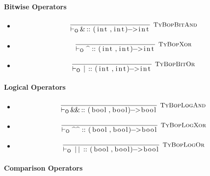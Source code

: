 \documentclass{article}
\newcommand{\code}[1]{\lstinline[columns=fixed]{#1}}
\newcommand{\drmrule}[5]{\frac{#1}{#2\vdash_{\mathsf{#3}}#4}\textsc{\ \small{#5}}}
\newcommand{\mc}[1]{\textnormal{\code{#1}}}
\newcommand{\subsubsubsection}{\paragraph}
\begin{document}
				\subsubsubsection{Bitwise Operators}
				
					\begin{itemize}
						\item
							\begin{align*}
								\drmrule{}{}{O}{\mc{\&} :: \mc{(int,int)->int}}{TyBopBitAnd}
							\end{align*}
						\item
							\begin{align*}
								\drmrule{}{}{O}{\mc{^} :: \mc{(int,int)->int}}{TyBopXor}
							\end{align*}
						\item
							\begin{align*}
								\drmrule{}{}{O}{\mc{|} :: \mc{(int,int)->int}}{TyBopBitOr}
							\end{align*}
					\end{itemize}
				
				\subsubsubsection{Logical Operators}
				
					\begin{itemize}
						\item 
							\begin{align*}
								\drmrule{}{}{O}{\mc{\&\&} :: \mc{(bool,bool)->bool}}{TyBopLogAnd}
							\end{align*}
						\item 
							\begin{align*}
								\drmrule{}{}{O}{\mc{\^\^} :: \mc{(bool,bool)->bool}}{TyBopLogXor}
							\end{align*}
						\item 
							\begin{align*}
								\drmrule{}{}{O}{\mc{||} :: \mc{(bool,bool)->bool}}{TyBopLogOr}
							\end{align*}
					\end{itemize}
				
				\subsubsubsection{Comparison Operators}
				
\end{document}
